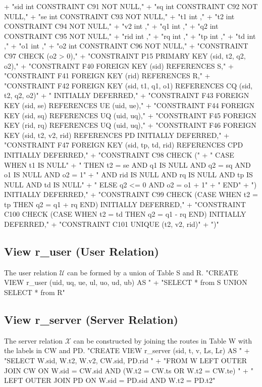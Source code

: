   + "sid int  CONSTRAINT C91 NOT NULL,"
  + "sq  int  CONSTRAINT C92 NOT NULL,"
  + "se  int  CONSTRAINT C93 NOT NULL,"
  + "t1  int  ,"
  + "t2  int  CONSTRAINT C94 NOT NULL,"
  + "v2  int  ,"
  + "q1  int  ,"
  + "q2  int  CONSTRAINT C95 NOT NULL,"
  + "rid int  ,"
  + "rq  int  ,"
  + "tp  int  ,"
  + "td  int  ,"
  + "o1  int  ,"
  + "o2  int  CONSTRAINT C96 NOT NULL,"
  + "CONSTRAINT C97 CHECK (o2 > 0),"
  + "CONSTRAINT P15 PRIMARY KEY (sid, t2, q2, o2),"
  + "CONSTRAINT F40 FOREIGN KEY (sid) REFERENCES S,"
  + "CONSTRAINT F41 FOREIGN KEY (rid) REFERENCES R,"
  + "CONSTRAINT F42 FOREIGN KEY (sid, t1, q1, o1) REFERENCES CQ (sid, t2, q2, o2)"
  + "  INITIALLY DEFERRED,"
  + "CONSTRAINT F43 FOREIGN KEY (sid, se) REFERENCES UE (uid, ue),"
  + "CONSTRAINT F44 FOREIGN KEY (sid, sq) REFERENCES UQ (uid, uq),"
  + "CONSTRAINT F45 FOREIGN KEY (rid, rq) REFERENCES UQ (uid, uq),"
  + "CONSTRAINT F46 FOREIGN KEY (sid, t2, v2, rid) REFERENCES PD INITIALLY DEFERRED,"
  + "CONSTRAINT F47 FOREIGN KEY (sid, tp, td, rid) REFERENCES CPD INITIALLY DEFERRED,"
  + "CONSTRAINT C98 CHECK ("
  + "  CASE WHEN t1 IS NULL"
  + "    THEN t2 = se AND q1 IS NULL AND q2 = sq AND o1 IS NULL AND o2 = 1"
  + "        AND rid IS NULL AND rq IS NULL AND tp IS NULL AND td IS NULL"
  + "    ELSE q2 <= 0 AND o2 = o1 + 1"
  + "  END"
  + ") INITIALLY DEFERRED,"
  + "CONSTRAINT  C99 CHECK (CASE WHEN t2 = tp THEN q2 = q1 + rq END) INITIALLY DEFERRED,"
  + "CONSTRAINT C100 CHECK (CASE WHEN t2 = td THEN q2 = q1 - rq END) INITIALLY DEFERRED,"
  + "CONSTRAINT C101 UNIQUE (t2, v2, rid)"
  + ")"
\nwendcode{}\nwdocspar

\subsection{View r\_user (User Relation)}
The user relation $\mathcal{U}$ can be formed by a union of Table S and R.
\nwenddocs{}\endmoddef{}
"CREATE VIEW r_user (uid, uq, ue, ul, uo, ud, ub) AS "
  + "SELECT * from S UNION SELECT * from R"
\nwendcode{}\nwdocspar

\subsection{View r\_server (Server Relation)}
The server relation $\mathcal{X}$ can be constructed by joining the routes in
Table W with the labels in CW and PD.
\nwenddocs{}\endmoddef{}
"CREATE VIEW r_server (sid, t, v, Ls, Lr) AS "
  + "SELECT W.sid, W.t2, W.v2, CW.sid, PD.rid "
  + "FROM W LEFT OUTER JOIN CW ON W.sid = CW.sid AND (W.t2 = CW.ts OR W.t2 = CW.te) "
  + "  LEFT OUTER JOIN PD ON W.sid = PD.sid AND W.t2 = PD.t2"
\nwendcode{}\nwdocspar

